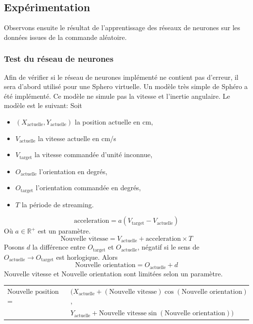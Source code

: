 \subsection{Expérimentation}
Observons ensuite le résultat de l'apprentissage des réseaux de neurones sur les données issues de la commande aléatoire.

\newcommand{\actu}[1]{#1_{\text{actuelle}}}
\newcommand{\target}[1]{#1_{\text{target}}}
\newcommand{\xactu}{\actu{X}}
\newcommand{\yactu}{\actu{Y}}
\newcommand{\vactu}{\actu{V}}
\newcommand{\vtarget}{\target{V}}
\newcommand{\oactu}{\actu{O}}
\newcommand{\otarget}{\target{O}}
\newcommand{\mpwekawidth}{.48\linewidth}
\newcommand{\incweka}[1]{\texttt{[image: \#1]}}
\newcommand{\wecaption}[1]{\caption{#1.\footnotesize (Généré par Weka 3.8.1)\normalsize}}
\subsubsection{Test du réseau de neurones}
Afin de vérifier si le réseau de neurones implémenté ne contient pas d'erreur, il sera d'abord utilisé pour une Sphero virtuelle.
Un modèle très simple de Sphéro a été implémenté. Ce modèle ne simule pas la vitesse et l'inertie angulaire.
Le modèle est le suivant: Soit
\begin{itemize}
 \item $(\xactu, \yactu)$ la position actuelle en cm,
 \item $\vactu$ la vitesse actuelle en cm/s
 \item $\vtarget$ la vitesse commandée d'unité inconnue,
 \item $\oactu$ l'orientation en degrés,
 \item $\otarget$ l'orientation commandée en degrés,
 \item $T$ la période de streaming.
\end{itemize}
\[ \text{acceleration} = a(\vtarget - \vactu)\]
Où $a \in \mathbb{R}^{+}$ est un paramètre.
\[ \text{Nouvelle vitesse} = \vactu + \text{acceleration} \times T \]
Posons $d$ la différence entre $\otarget$ et $\oactu$, négatif si le sens de $\oactu \rightarrow \otarget$ est horlogique.
Alors
\[ \text{Nouvelle orientation} = \oactu + d \]
Nouvelle vitesse et Nouvelle orientation sont limitées selon un paramètre.
\begin{center}
 \begin{tabular}{ll}
  Nouvelle position = & $(\xactu + (\text{Nouvelle vitesse})\cos(\text{Nouvelle orientation})$,\\
   & $\yactu + \text{Nouvelle vitesse}\sin(\text{Nouvelle orientation}))$
 \end{tabular}
\end{center}

